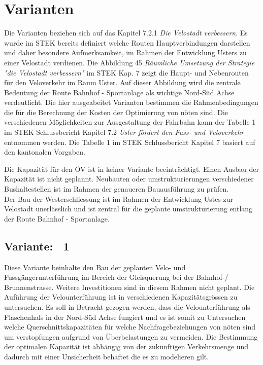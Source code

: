 %
%
%
%

\chapter{Varianten}
\label{chap:Varianten}

Die Varianten beziehen sich auf das Kapitel 7.2.1 \textit{Die Velostadt verbessern}. Es wurde im STEK bereits definiert welche Routen Hauptverbindungen darstellen und daher besondere Aufmerksamkeit, im Rahmen der Entwicklung Usters zu einer Velostadt verdienen.
Die Abbildung 45 \textit{Räumliche Umsetzung der Strategie "die Velostadt verbessern"} im STEK Kap. 7 zeigt die Haupt- und Nebenrouten für den Veloverkehr im Raum Uster.
Auf dieser Abbildung wird die zentrale Bedeutung der Route Bahnhof - Sportanlage als wichtige Nord-Süd Achse verdeutlicht.
Die hier ausgeabeitet Varianten bestimmen die Rahmenbedingungen die für die Berechnung der Kosten der Optimierung von nöten sind. 
Die verschiedenen Möglichkeiten zur Ausgestaltung der Fahrbahn kann der Tabelle 1 im STEK Schlussbericht Kapitel 7.2 \textit{Uster fördert den Fuss- und Veloverkehr} entnommen werden.  
Die Tabelle 1 im STEK Schlussbericht Kapitel 7 basiert auf den kantonalen Vorgaben. 

Die Kapazität für den ÖV ist in keiner Variante beeinträchtigt. Einen Ausbau der Kapazität ist nicht geplannt. Neubauten oder umstrukturierungen verschiedener Bushaltestellen ist im Rahmen der genaueren Bauausführung zu prüfen. \\
Der Bau der Westerschliessung ist im Rahmen der Entwicklung Ustes zur Velostadt unerlässlich und ist zentral für die geplante umstrukturierung entlang der Route Bahnhof - Sportanlage.

\section{Variante: \ 1}
\label{chap:V1}
	
Diese Variante beinhalte den Bau der geplanten Velo- und Fussgängerunterführung im Bereich der Gleisquerung bei der Bahnhof-/ Brunnenstrasse. Weitere Investitionen sind in diesem Rahmen nicht geplant. Die Auführung der Velounterführung ist in verschiedenen Kapazitätsgrössen zu untersuchen. Es soll in Betracht gezogen werden, dass die Velounterführung als Flaschenhals in der Nord-Süd Achse fungiert und es ist somit zu Untersuchen welche Querschnittskapazitäten für welche Nachfragebeziehungen von nöten sind um verstopfungen aufgrund von Überbelastungen zu vermeiden. Die Bestimmung der optimalen Kapazität ist abhängig von der zukünftigen Verkehrsmenge und dadurch mit einer Unsicherheit behaftet die es zu modelieren gilt. 


